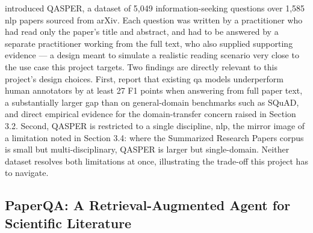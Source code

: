 \citet{dasigi2021dataset} introduced QASPER, a dataset of 5,049 information-seeking questions over 1,585 \gls{nlp} papers sourced from arXiv. Each question was written by a practitioner who had read only the paper's title and abstract, and had to be answered by a separate practitioner working from the full text, who also supplied supporting evidence — a design meant to simulate a realistic reading scenario very close to the use case this project targets.
\newline \newline Two findings are directly relevant to this project's design choices. First, \citet{dasigi2021dataset} report that existing \gls{qa} models underperform human annotators by at least 27 F1 points when answering from full paper text, a substantially larger gap than on general-domain benchmarks such as SQuAD, and direct empirical evidence for the domain-transfer concern raised in Section 3.2. Second, QASPER is restricted to a single discipline, \gls{nlp}, the mirror image of a limitation noted in Section 3.4: where the Summarized Research Papers corpus is small but multi-disciplinary, QASPER is larger but single-domain. Neither dataset resolves both limitations at once, illustrating the trade-off this project has to navigate.

\subsection{PaperQA: A Retrieval-Augmented Agent for Scientific Literature}

